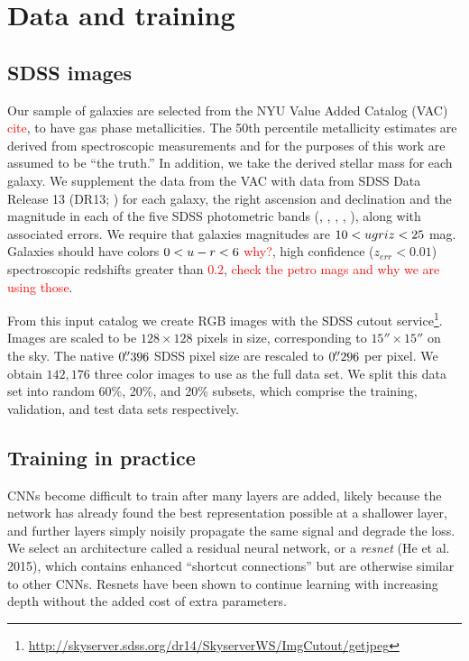 \documentclass[fleqn,usenatbib]{mnras}
\newcommand{\editorial}[1]{\textcolor{red}{#1}}
\begin{document}
\section{Data and training}\label{sec:data}

\subsection{SDSS images}
Our sample of galaxies are selected from the NYU Value Added Catalog (VAC) \editorial{cite}, to have gas phase metallicities. The 50th percentile metallicity estimates \citep{Tremonti2004} are derived from spectroscopic measurements and for the purposes of this work are assumed to be ``the truth.'' In addition, we take the derived stellar mass for each galaxy.
We supplement the data from the VAC with data from SDSS Data Release 13 (DR13; \citealt{Albareti2017}) for each galaxy, the right ascension and declination and the magnitude in each of the five SDSS photometric bands (\sdssu, \sdssg, \sdssr, \sdssi, \sdssz), along with associated errors. We require that galaxies magnitudes are $10 < \hbox{$u$}\hbox{$g$}\hbox{$r$}\hbox{$i$}\hbox{$z$} < 25$ mag. Galaxies should have colors $0 < \hbox{$u$}-\hbox{$r$} < 6$ \editorial{why?}, high confidence ($z_{err} < 0.01$) spectroscopic redshifts greater than \editorial{$0.2$}, \editorial{check the petro mags and why we are using those}.

From this input catalog we create RGB images with the SDSS cutout service\footnote{\url{http://skyserver.sdss.org/dr14/SkyserverWS/ImgCutout/getjpeg}}. Images are scaled to be $128\times128$ pixels in size, corresponding to $15''\times15''$ on the sky. The native $0\hbox{$.\!\!^{\prime\prime}$}396$ SDSS pixel size are rescaled to $0\hbox{$.\!\!^{\prime\prime}$}296$ per pixel.
We obtain $142,176$ three color images to use as the full data set.
We split this data set into random 60\%, 20\%, and 20\% subsets, which comprise the training, validation, and test data sets respectively.

\subsection{Training in practice}


CNNs become difficult to train after many layers are added, likely because the network has already found the best representation possible at a shallower layer, and further layers simply noisily propagate the same signal and degrade the loss.
We select an architecture called a residual neural network, or a \textit{resnet} (He et al. 2015), which contains enhanced ``shortcut connections'' but are otherwise similar to other CNNs.
Resnets have been shown to continue learning with increasing depth without the added cost of extra parameters.
\end{document}
